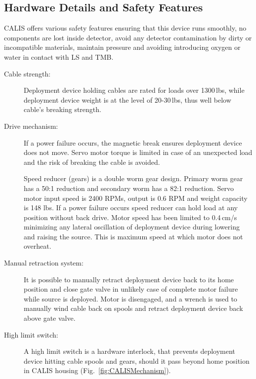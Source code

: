 \subsection{Hardware Details and Safety Features}\label{sec:HardwareDetails}\label{sec:SafetyFeatures}
CALIS offers various safety features ensuring that this device runs smoothly, no components are lost inside detector, avoid any detector contamination by dirty or incompatible materials, maintain pressure and avoiding introducing oxygen or water in contact with LS and TMB. %

\begin{description}

\item[Cable strength:]
Deployment device holding cables are rated for loads over 1300\,lbs, while deployment device weight is at the level of 20-30\,lbs, thus well below cable's breaking strength. 

\item[Drive mechanism:]
If a power failure occurs, the magnetic break ensures deployment device does not move. Servo motor torque is limited in case of an unexpected load and the risk of breaking the cable is avoided.

Speed reducer (gears) is a double worm gear design. Primary worm gear has a 50:1 reduction and secondary worm has a 82:1 reduction. Servo motor input speed is 2400 RPMs, output is 0.6 RPM and weight capacity is 148 lbs. If a power failure occurs speed reducer can hold load at any position without back drive. Motor speed has been limited to 0.4\,cm/s minimizing any lateral oscillation of deployment device during lowering and raising the source. This is maximum speed at which motor does not overheat.

\item[Manual retraction system:]
It is possible to manually retract deployment device back to its home position and close gate valve in unlikely case of complete motor failure while source is deployed. Motor is disengaged, and a wrench is used to manually wind cable back on spools and retract deployment device back above gate valve. 
   
\item[High limit switch:]
A high limit switch is a hardware interlock, that prevents deployment device hitting cable spools and gears, should it pass beyond home position in CALIS housing (Fig.~\ref{fig:CALISMechanism}). 


\end{description}
